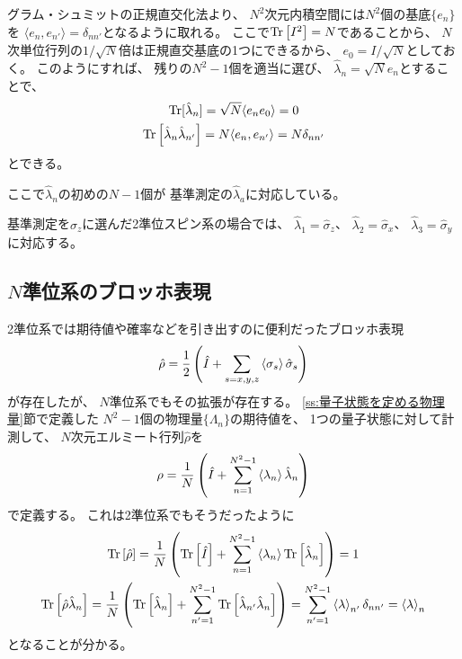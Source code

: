 \documentclass[a4paper, 10pt]{jsarticle}
\begin{document}
\begin{problem}
	グラム・シュミットの正規直交化法より、
	$N^2$次元内積空間には$N^2$個の基底$\{ e_n \}$を
	$\langle e_n, e_{n'} \rangle = \delta_{nn'}$となるように取れる。
	ここで$\operatorname*{Tr} \left[ I^2 \right] = N$であることから、
	$N$次単位行列の$1/\sqrt{N}$倍は正規直交基底の1つにできるから、
	$e_0 = I/\sqrt{N}$としておく。
	このようにすれば、
	残りの$N^2 - 1$個を適当に選び、
	$\hat{\lambda}_n = \sqrt{N} e_n$とすることで、
	\begin{gather}
		\operatorname*{Tr}[ \hat{\lambda}_n ]
		= \sqrt{N} \langle e_n e_0 \rangle
		= 0 \\
		\operatorname*{Tr} \left[ \hat{\lambda}_n \hat{\lambda}_{n'} \right]
		= N \langle e_n, e_{n'} \rangle
		= N \delta_{nn'}
	\end{gather}
	とできる。
\end{problem}
ここで$\hat{\lambda}_n$の初めの$N-1$個が
基準測定の$\hat{\lambda}_a$に対応している。

基準測定を$\sigma_z$に選んだ2準位スピン系の場合では、
$\hat{\lambda}_1 = \hat{\sigma}_z$、
$\hat{\lambda}_2 = \hat{\sigma}_x$、
$\hat{\lambda}_3 = \hat{\sigma}_y$に対応する。

\subsection{$N$準位系のブロッホ表現}
2準位系では期待値や確率などを引き出すのに便利だったブロッホ表現
\begin{align}
	\hat{\rho}
	= \frac{1}{2} \left( \hat{I}
	+ \sum_{s = x, y, z} \Braket{\sigma_s} \hat{\sigma}_s \right)
\end{align}
が存在したが、
$N$準位系でもその拡張が存在する。
\ref{ss:量子状態を定める物理量}節で定義した
$N^2 - 1$個の物理量$\{ \Lambda_n \}$の期待値を、
1つの量子状態に対して計測して、
$N$次元エルミート行列$\hat{\rho}$を
\begin{align}
	\rho = \frac{1}{N} \left( \hat{I}
	+ \sum_{n=1}^{N^2 - 1} \Braket{\lambda_n} \hat{\lambda}_n \right)
\end{align}
で定義する。
これは2準位系でもそうだったように
\begin{gather}
	\operatorname*{Tr} \left[ \hat{\rho} \right]
	= \frac{1}{N} \left( \operatorname*{Tr} \left[ \hat{I} \right] + \sum_{n=1}^{N^2 - 1}
	\Braket{\lambda_n} \operatorname*{Tr} \left[ \hat{\lambda}_n \right] \right)
	= 1 \\
	\operatorname*{Tr} \left[ \hat{\rho} \hat{\lambda}_n \right]
	= \frac{1}{N} \left( \operatorname*{Tr} \left[ \hat{\lambda}_n \right]
	+ \sum_{n'=1}^{N^2 - 1} \operatorname*{Tr} \left[ \hat{\lambda}_{n'}
	\hat{\lambda}_n \right] \right)
	= \sum_{n'=1}^{N^2 - 1} \Braket{\lambda}_{n'} \delta_{nn'}
	= \Braket{\lambda}_n
\end{gather}
となることが分かる。
\end{document}
